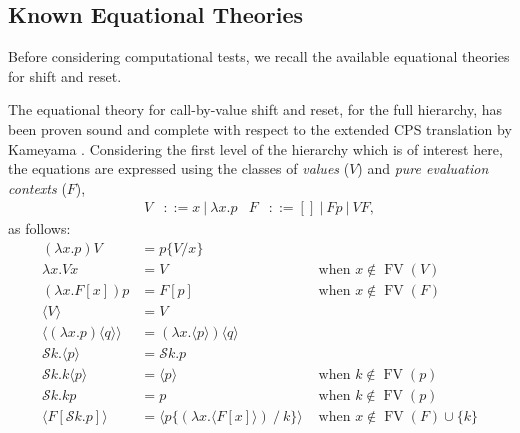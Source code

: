 \documentclass{eptcs}
\DeclareMathOperator{\FV}{FV}
\newcommand{\ureset}[1]{\langle{#1}\rangle}
\newcommand{\ushift}[2]{\mathcal{S}{#1}.{#2}}
\theoremstyle{definition}
\theoremstyle{plain}
\theoremstyle{remark}
\begin{document}
\subsection{Known Equational Theories}

Before considering computational tests, we recall the available equational theories for shift and reset. 

The equational theory for call-by-value shift and reset, for the full hierarchy, has been proven sound and complete with respect to the extended CPS translation \cite{DanvyF1990} by Kameyama \cite{Kameyama2007}. Considering the first level of the hierarchy which is of interest here, the equations are expressed using the classes of \emph{values} ($V$) and \emph{pure evaluation contexts} ($F$),
\begin{align*}
  V &::= x ~|~ \lambda x.p &
  F &::= [] ~|~ F p ~|~ V F,
\end{align*}
as follows:
\begin{align}
(\lambda x.p) V &= p \{V/x\}\\
\lambda x. V x &= V & \text{ when }x\notin \FV(V)\\
(\lambda x. F[x])p &= F[p] & \text{ when }x\notin \FV(F)\\
\label{reset-value}\ureset{V} &= V\\
\ureset{(\lambda x.p)\ureset{q}} &= (\lambda x. \ureset{p})\ureset{q}\\
\ushift{k}{\ureset{p}} &= \ushift{k}{p}\\
\ushift{k}{k\ureset{p}} &= \ureset{p}&\text{ when }k\notin \FV(p)\\
\ushift{k}{k p} &= p&\text{ when }k\notin \FV(p)\\
\ureset{F[\ushift{k}{p}]} &= \ureset{p\{(\lambda x.\ureset{F[x]}) ~/~ k\}}&\text{ when }x\notin \FV(F)\cup\{k\}
\end{align}
\end{document}
